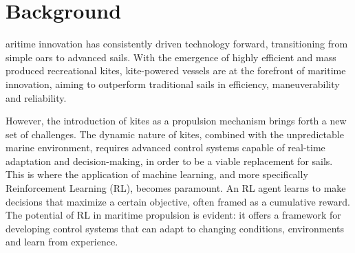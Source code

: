 %

%
\let\textcircled=\pgftextcircled
\chapter{Background}\label{chap:background}






aritime innovation has consistently driven technology forward, transitioning from simple oars to advanced sails. With the emergence of highly efficient and mass produced recreational kites, kite-powered vessels are at the forefront of maritime innovation, aiming to outperform traditional sails in efficiency, maneuverability and reliability.

However, the introduction of kites as a propulsion mechanism brings forth a new set of challenges. The dynamic nature of kites, combined with the unpredictable marine environment, requires advanced control systems capable of real-time adaptation and decision-making, in order to be a viable replacement for sails. This is where the application of machine learning, and more specifically Reinforcement Learning (RL), becomes paramount. An RL agent learns to make decisions that maximize a certain objective, often framed as a cumulative reward. The potential of RL in maritime propulsion is evident: it offers a framework for developing control systems that can adapt to changing conditions, environments and learn from experience. 

